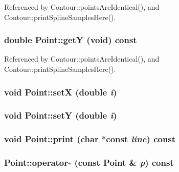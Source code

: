 Referenced by Contour::pointsAreIdentical(), and Contour::printSplineSamplesHere().\hypertarget{classPoint_1b00b67b5e96ce7e02011c170f07bf11}{
\subsubsection[getY]{\setlength{\rightskip}{0pt plus 5cm}double Point::getY (void) const}}
\label{classPoint_1b00b67b5e96ce7e02011c170f07bf11}




Referenced by Contour::pointsAreIdentical(), and Contour::printSplineSamplesHere().\hypertarget{classPoint_9290a4098a3331e34f158eeca694a26c}{
\subsubsection[setX]{\setlength{\rightskip}{0pt plus 5cm}void Point::setX (double {\em i})}}
\label{classPoint_9290a4098a3331e34f158eeca694a26c}


\hypertarget{classPoint_387c7e206f5ba0ea575020e53a66fb55}{
\subsubsection[setY]{\setlength{\rightskip}{0pt plus 5cm}void Point::setY (double {\em i})}}
\label{classPoint_387c7e206f5ba0ea575020e53a66fb55}


\hypertarget{classPoint_67517850a2ef6cfe8d6beb161be65e5c}{
\subsubsection[print]{\setlength{\rightskip}{0pt plus 5cm}void Point::print (char $\ast$const  {\em line}) const}}
\label{classPoint_67517850a2ef6cfe8d6beb161be65e5c}


\hypertarget{classPoint_6a869eababaaf863740e3196b9ca6780}{
\subsubsection[operator-]{ Point::operator- (const {\bf Point} \& {\em p}) const}}
\label{classPoint_6a869eababaaf863740e3196b9ca6780}




